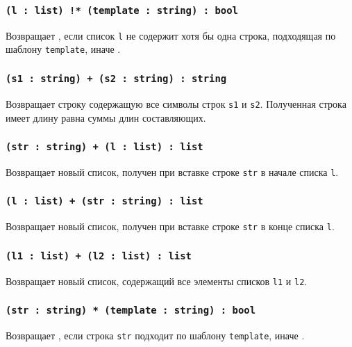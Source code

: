 \subsubsection{\texttt{(l : list) !* (template : string) : bool}}

Возвращает \true{}, если список \texttt{l} не содержит хотя бы одна строка, подходящая по шаблону \texttt{template}, иначе \false{}.

\subsubsection{\texttt{(s1 : string) + (s2 : string) : string}}

Возвращает строку содержащую все символы строк \texttt{s1} и \texttt{s2}. Полученная строка имеет длину равна суммы длин составляющих.

\subsubsection{\texttt{(str : string) + (l : list) : list}}

Возвращает новый список, получен при вставке строке \texttt{str} в начале списка \texttt{l}.

\subsubsection{\texttt{(l : list) + (str : string) : list}}

Возвращает новый список, получен при вставке строке \texttt{str} в конце списка \texttt{l}.

\subsubsection{\texttt{(l1 : list) + (l2 : list) : list}}

Возвращает новый список, содержащий все элементы списков \texttt{l1} и \texttt{l2}.

\subsubsection{\texttt{(str : string) * (template : string) : bool}}

Возвращает \true{}, если строка \texttt{str} подходит по шаблону \texttt{template}, иначе \false{}.

